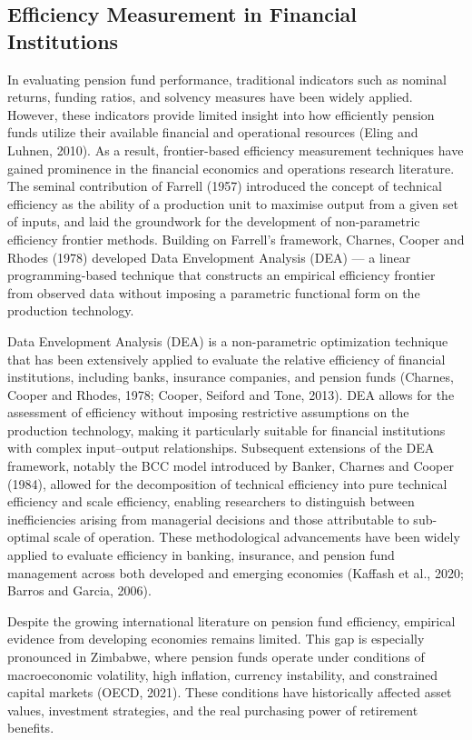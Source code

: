 \documentclass[12pt,a4paper]{article}
\begin{document}
\subsection{Efficiency Measurement in Financial Institutions}

In evaluating pension fund performance, traditional indicators such as nominal returns, funding ratios, and solvency measures have been widely applied. However, these indicators provide limited insight into how efficiently pension funds utilize their available financial and operational resources (Eling and Luhnen, 2010). As a result, frontier-based efficiency measurement techniques have gained prominence in the financial economics and operations research literature. The seminal contribution of Farrell (1957) introduced the concept of technical efficiency as the ability of a production unit to maximise output from a given set of inputs, and laid the groundwork for the development of non-parametric efficiency frontier methods. Building on Farrell's framework, Charnes, Cooper and Rhodes (1978) developed Data Envelopment Analysis (DEA) --- a linear programming-based technique that constructs an empirical efficiency frontier from observed data without imposing a parametric functional form on the production technology.

Data Envelopment Analysis (DEA) is a non-parametric optimization technique that has been extensively applied to evaluate the relative efficiency of financial institutions, including banks, insurance companies, and pension funds (Charnes, Cooper and Rhodes, 1978; Cooper, Seiford and Tone, 2013). DEA allows for the assessment of efficiency without imposing restrictive assumptions on the production technology, making it particularly suitable for financial institutions with complex input--output relationships. Subsequent extensions of the DEA framework, notably the BCC model introduced by Banker, Charnes and Cooper (1984), allowed for the decomposition of technical efficiency into pure technical efficiency and scale efficiency, enabling researchers to distinguish between inefficiencies arising from managerial decisions and those attributable to sub-optimal scale of operation. These methodological advancements have been widely applied to evaluate efficiency in banking, insurance, and pension fund management across both developed and emerging economies (Kaffash et al., 2020; Barros and Garcia, 2006).

Despite the growing international literature on pension fund efficiency, empirical evidence from developing economies remains limited. This gap is especially pronounced in Zimbabwe, where pension funds operate under conditions of macroeconomic volatility, high inflation, currency instability, and constrained capital markets (OECD, 2021). These conditions have historically affected asset values, investment strategies, and the real purchasing power of retirement benefits.
\end{document}
